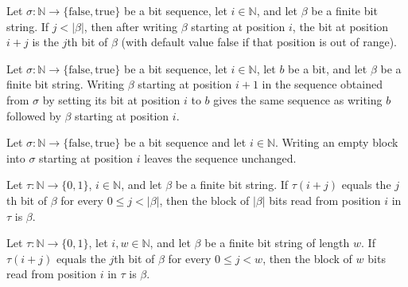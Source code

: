 \begin{theorem}
\label{Complexity.TQBFHard.writeBlock_of_mem}
\leanok
{}
Let $\sigma:\mathbb{N}\to\{\mathrm{false},\mathrm{true}\}$ be a bit sequence, let
$i\in\mathbb{N}$, and let $\beta$ be a finite bit string. If $j<|\beta|$, then after
writing $\beta$ starting at position $i$, the bit at position $i+j$ is the $j$th bit of
$\beta$ (with default value false if that position is out of range).
\end{theorem}

\begin{theorem}
\label{Complexity.TQBFHard.writeBlock_update_cons}
\leanok
{}
Let $\sigma:\mathbb{N}\to\{\mathrm{false},\mathrm{true}\}$ be a bit sequence, let
$i\in\mathbb{N}$, let $b$ be a bit, and let $\beta$ be a finite bit string. Writing
$\beta$ starting at position $i+1$ in the sequence obtained from $\sigma$ by setting its
bit at position $i$ to $b$ gives the same sequence as writing $b$ followed by $\beta$
starting at position $i$.
\end{theorem}

\begin{theorem}
\label{Complexity.TQBFHard.writeBlock_nil}
\leanok
{}
Let $\sigma:\mathbb{N}\to\{\mathrm{false},\mathrm{true}\}$ be a bit sequence and let
$i\in\mathbb{N}$. Writing an empty block into $\sigma$ starting at position $i$ leaves
the sequence unchanged.
\end{theorem}

\begin{theorem}
\label{Complexity.TQBFHard.readBlock_eq}
\leanok
{}
Let $\tau:\mathbb N\to\{0,1\}$, $i\in\mathbb N$, and let $\beta$ be a finite bit string.
If $\tau(i+j)$ equals the $j$th bit of $\beta$ for every $0\le j<|\beta|$, then the
block of $|\beta|$ bits read from position $i$ in $\tau$ is $\beta$.
\end{theorem}

\begin{theorem}
\label{Complexity.TQBFHard.readBlock_eq'}
\leanok
{}
Let $\tau:\mathbb N\to\{0,1\}$, let $i,w\in\mathbb N$, and let $\beta$ be a finite bit
string of length $w$. If $\tau(i+j)$ equals the $j$th bit of $\beta$ for every $0\le
j<w$, then the block of $w$ bits read from position $i$ in $\tau$ is $\beta$.
\end{theorem}

